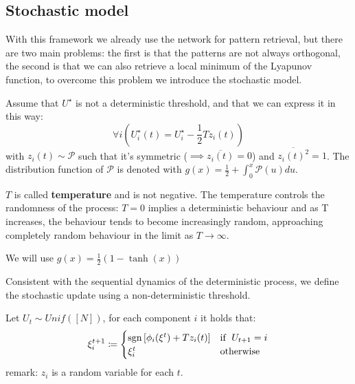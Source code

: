 \subsection{Stochastic model}
With this framework we already use the network for pattern retrieval, but there are two main problems: the first is that the patterns are not always orthogonal, the second is that we can also retrieve a local minimum of the Lyapunov function, to overcome this problem we introduce the stochastic model.

\noindent Assume that $U^\star$ is not a deterministic threshold, and that we can express it in this way:
\[
    \forall{i}\left(U_i^\star\left(t\right) = U_i^\star - \frac12 T z_i\left(t\right)\right)
\]
with $z_i\left(t\right)\sim\mathcal{P}$ such that it's symmetric ($\implies\overline{z_i\left(t\right)}=0$) and $\overline{z_i\left(t\right)^2}=1$. The distribution function of $\mathcal{P}$ is denoted with $g\left(x\right)=\frac12 + \int_0^x\mathcal{P}\left(u\right)du$.

\noindent $T$ is called \textbf{temperature} and is not negative. The temperature controls the randomness of the process: $T=0$ implies a deterministic behaviour and as T increases, the behaviour tends to become increasingly random, approaching completely random behaviour in the limit as $T \to \infty$.

\begin{remark}
   We will use $g\left(x\right)=\frac12\left(1-\tanh\left(x\right)\right)$
\end{remark}

\begin{definition}
    \label{def:stocdyn}
    Consistent with the sequential dynamics of the deterministic process, we define the stochastic update using a non-deterministic threshold.

    \noindent Let $U_t\sim \textit{Unif}\left(\left[N\right]\right)$, for each component $i$ it holds that:
    \[ \xi_i^{t+1} \coloneqq
    \begin{cases}
        \operatorname{sgn}\left[\phi_i(\xi^t) + Tz_i(t)\right] & \text{if }\;U_{t+1}=i \\
        \xi_i^t & \text{otherwise}
    \end{cases}
    \]
    remark: $z_i$ is a random variable for each $t$.
\end{definition}

